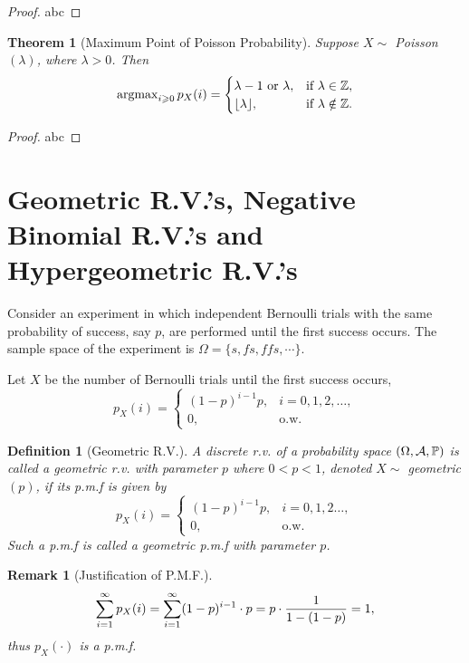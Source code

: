 \documentclass[openany,12pt]{book}
\newtheorem{theorem}{Theorem}[chapter]
\newtheorem{remark}{Remark}[chapter]
\newtheorem{definition}{Definition}[chapter]
\begin{document}
\begin{proof}
  abc
\end{proof}

\begin{theorem}[Maximum Point of Poisson Probability]
  Suppose $X\sim$ Poisson$(\lambda)$, where $\lambda>0$. Then
  $$
    \operatorname{argmax}_{i\geqslant0} p_X(i)=
    \begin{cases}
      \lambda-1 \text{ or } \lambda, &\text{if}~\lambda\in\mathbb{Z}, \\
      \lfloor\lambda\rfloor, &\text{if}~\lambda\notin\mathbb{Z}.
    \end{cases}
  $$
\end{theorem}

\begin{proof}
  abc
\end{proof}

\section{Geometric R.V.'s, Negative Binomial R.V.'s and Hypergeometric R.V.'s}

Consider an experiment in which independent Bernoulli trials with the same probability of success, say $p$, are performed until the first success occurs. The sample space of the experiment is $\Omega=\{s,fs,ffs,\cdots\}$.

Let $X$ be the number of Bernoulli trials until the first success occurs,
$$
  p_X(i)=
  \begin{cases}
    (1-p)^{i-1}p, & i=0,1,2,\dots, \\
    0, &\text{o.w.}
  \end{cases}
$$

\begin{definition}[Geometric R.V.]
  A discrete r.v. of a probability space $(\Omega,\mathcal{A},\mathbb{P})$ is called a geometric r.v. with parameter $p$ where $0<p<1$, denoted $X\sim$ geometric$(p)$, if its p.m.f is given by
  $$
    p_X(i)=
    \begin{cases}
      (1-p)^{i-1}p, &i=0,1,2\dots, \\
      0, &\text{o.w.}
    \end{cases}
  $$
  Such a p.m.f is called a geometric p.m.f with parameter $p$.
\end{definition}

\begin{remark}[Justification of P.M.F.]
  $$
    \sum_{i=1}^{\infty} p_X(i)=\sum_{i=1}^{\infty}(1-p)^{i-1}\cdot p=p\cdot\frac{1}{1-(1-p)}=1,
  $$
  thus $p_X(\cdot)$ is a p.m.f.
\end{remark}
\end{document}
